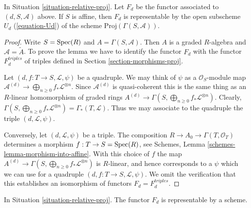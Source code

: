 \begin{lemma}
\label{lemma-relative-proj-affine}
In Situation \ref{situation-relative-proj}. Let $F_d$ be the functor
associated to $(d, S, \mathcal{A})$ above.
If $S$ is affine, then $F_d$ is representable by the open subscheme
$U_d$ (\ref{equation-Ud})
of the scheme $\text{Proj}(\Gamma(S, \mathcal{A}))$.
\end{lemma}

\begin{proof}
Write $S = \mathop{\mathrm{Spec}}(R)$ and $A = \Gamma(S, \mathcal{A})$.
Then $A$ is a graded $R$-algebra and $\mathcal{A} = \widetilde A$.
To prove the lemma we have to identify the functor $F_d$
with the functor $F_d^{triples}$ of triples defined in Section
\ref{section-morphisms-proj}.

\medskip\noindent
Let $(d, f : T \to S, \mathcal{L}, \psi)$ be a quadruple.
We may think of $\psi$ as a $\mathcal{O}_S$-module map
$\mathcal{A}^{(d)} \to \bigoplus_{n \geq 0} f_*\mathcal{L}^{\otimes n}$.
Since $\mathcal{A}^{(d)}$ is quasi-coherent this is the same
thing as an $R$-linear homomorphism of graded rings
$A^{(d)} \to \Gamma(S, \bigoplus_{n \geq 0} f_*\mathcal{L}^{\otimes n})$.
Clearly, $\Gamma(S, \bigoplus_{n \geq 0} f_*\mathcal{L}^{\otimes n}) =
\Gamma_*(T, \mathcal{L})$. Thus we may associate to
the quadruple the triple $(d, \mathcal{L}, \psi)$.

\medskip\noindent
Conversely, let $(d, \mathcal{L}, \psi)$ be a triple.
The composition $R \to A_0 \to \Gamma(T, \mathcal{O}_T)$
determines a morphism $f : T \to S = \mathop{\mathrm{Spec}}(R)$, see
Schemes, Lemma \ref{schemes-lemma-morphism-into-affine}.
With this choice of $f$ the map
$A^{(d)} \to \Gamma(S, \bigoplus_{n \geq 0} f_*\mathcal{L}^{\otimes n})$
is $R$-linear, and hence corresponds to a $\psi$ which we
can use for a quadruple $(d, f : T \to S, \mathcal{L}, \psi)$.
We omit the verification that this establishes an isomorphism
of functors $F_d = F_d^{triples}$.
\end{proof}

\begin{lemma}
\label{lemma-relative-proj-d}
In Situation \ref{situation-relative-proj}.
The functor $F_d$ is representable by a scheme.
\end{lemma}

